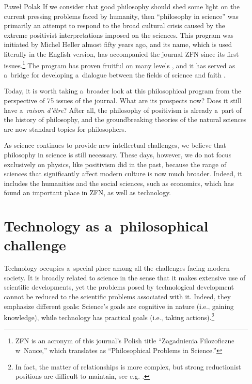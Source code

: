 \begin{artengenv}{Paweł Polak}
If we consider that good philosophy should shed some light on the current pressing problems faced by humanity, then ``philosophy in science'' was primarily an attempt to respond to the broad cultural crisis caused by the extreme positivist interpretations imposed on the sciences. This program was initiated by Michel Heller almost fifty years ago, and its name, which is used literally in the English version, has accompanied the journal ZFN since its first issues.\footnote{ZFN is an acronym of this journal's Polish title ``Zagadnienia Filozoficzne w~Nauce,'' which translates as ``Philosophical Problems in Science.''} The program has proven fruitful on many levels 
\parencites[e.g.,][]{brozek_philosophy_2011}[][]{polak_oblicza_2017}, %
 and it has served as a~bridge for developing a~dialogue between the fields of science and faith 
\parencite[][]{polak_theory_2023}.%




Today, it is worth taking a~broader look at this philosophical program from the perspective of 75 issues of the journal. What are its prospects now? Does it still have a~\textit{raison d'être}? After all, the philosophy of positivism is already a~part of the history of philosophy, and the groundbreaking theories of the natural sciences are now standard topics for philosophers.



As science continues to provide new intellectual challenges, we believe that philosophy in science is still necessary. These days, however, we do not focus exclusively on physics, like positivism did in the past, because the range of sciences that significantly affect modern culture is now much broader. Indeed, it includes the humanities and the social sciences, such as economics, which has found an important place in ZFN, as well as technology.



\section{Technology as a~philosophical challenge}

Technology occupies a~special place among all the challenges facing modern society. It is broadly related to science in the sense that it makes extensive use of scientific developments, yet the problems posed by technological development cannot be reduced to the scientific problems associated with it. Indeed, they emphasize different goals: Science's goals are cognitive in nature (i.e., gaining knowledge), while technology has practical goals (i.e., taking actions).\footnote{In fact, the matter of relationships is more complex, but strong reductionist positions are difficult to maintain, see e.g. 
\parencite[][sec.2.1.-2.2.]{franssen_philosophy_2023}.%
}




\end{artengenv}
